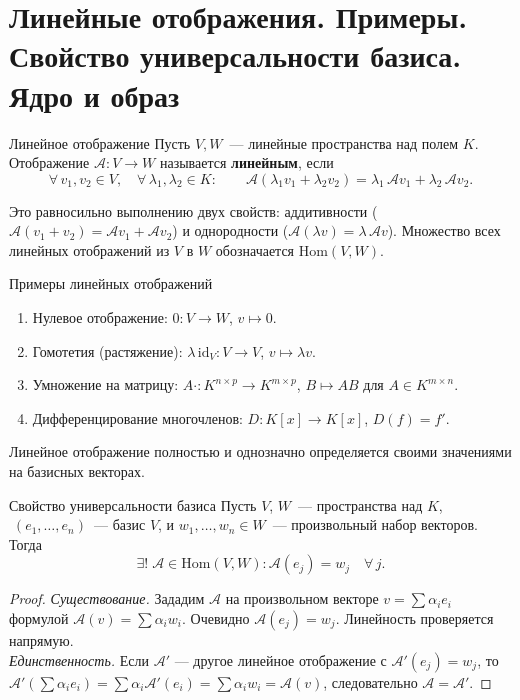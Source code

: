 
\section{Линейные отображения. Примеры. Свойство универсальности базиса. Ядро и образ}

\begin{Definition}{Линейное отображение}{}
	Пусть $V, W$~--- линейные пространства над полем $K$.
	Отображение $\mathcal{A} \colon V \longrightarrow W$ называется \textbf{линейным}, если
	\[
	\forall\, v_1, v_2 \in V,\quad \forall\, \lambda_1, \lambda_2 \in K \colon
	\qquad
	\mathcal{A}(\lambda_1 v_1 + \lambda_2 v_2) = \lambda_1\,\mathcal{A}v_1 + \lambda_2\,\mathcal{A}v_2.
	\]
\end{Definition}

Это равносильно выполнению двух свойств: аддитивности ($\mathcal{A}(v_1 + v_2) = \mathcal{A}v_1 + \mathcal{A}v_2$) и однородности ($\mathcal{A}(\lambda v) = \lambda\,\mathcal{A}v$).
Множество всех линейных отображений из $V$ в $W$ обозначается $\mathrm{Hom}(V, W)$.

\begin{Example}{Примеры линейных отображений}{}
	\begin{enumerate}
		\item Нулевое отображение: $0 \colon V \to W$, $v \mapsto 0$.
		\item Гомотетия (растяжение): $\lambda\,\mathrm{id}_V \colon V \to V$, $v \mapsto \lambda v$.
		\item Умножение на матрицу: $A \cdot \colon K^{n \times p} \to K^{m \times p}$, $B \mapsto AB$ для $A \in K^{m \times n}$.
		\item Дифференцирование многочленов: $D \colon K[x] \to K[x]$, $D(f) = f'$. 
	\end{enumerate}
\end{Example}

Линейное отображение полностью и однозначно определяется своими значениями на базисных векторах.

\begin{Proposition}{Свойство универсальности базиса}{}
	Пусть $V$, $W$~--- пространства над $K$, $\;(e_1, \ldots, e_n)$~--- базис $V$,
	и $w_1, \ldots, w_n \in W$~---  произвольный набор векторов. Тогда
	\[
	\exists!\; \mathcal{A} \in \mathrm{Hom}(V, W) \colon \mathcal{A}(e_j) = w_j \quad \forall\, j.
	\]
\end{Proposition}
\begin{proof}
	\textit{Существование.} Зададим $\mathcal{A}$ на произвольном векторе $v = \sum \alpha_i e_i$ формулой $\mathcal{A}(v) = \sum \alpha_i w_i$. Очевидно $\mathcal{A}(e_j) = w_j$. Линейность проверяется напрямую.\\
	\textit{Единственность.} Если $\mathcal{A}'$ --- другое линейное отображение с $\mathcal{A}'(e_j) = w_j$, то $\mathcal{A}'(\sum \alpha_i e_i) = \sum \alpha_i \mathcal{A}'(e_i) = \sum \alpha_i w_i = \mathcal{A}(v)$, следовательно $\mathcal{A} = \mathcal{A}'$.
\end{proof}

